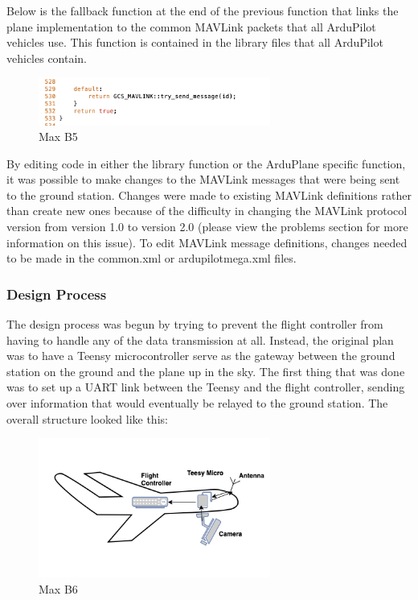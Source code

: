 \documentclass[12pt,journal,compsoc]{IEEEtran}
\begin{document}
Below is the fallback function at the end of the previous function that links the plane implementation to the common MAVLink packets that all ArduPilot vehicles use. This function is contained in the library files that all ArduPilot vehicles contain. 
\begin{figure}[h!]
\hspace*{0cm}
\centering
\includegraphics[width=3in]{Fallthrough.png}
\caption{Max B5}
\label{fallthrough}
\end{figure}

By editing code in either the library function or the ArduPlane specific function, it was possible to make changes to the MAVLink messages that were being sent to the ground station. 
Changes were made to existing MAVLink definitions rather than create new ones because of the difficulty in changing the MAVLink protocol version from version 1.0 to version 2.0 (please view the problems section for more information on this issue). To edit MAVLink message definitions, changes needed to be made in the common.xml or ardupilotmega.xml files.
\subsubsection{Design Process}
The design process was begun by trying to prevent the flight controller from having to handle any of the data transmission at all. Instead, the original plan was to have a Teensy microcontroller serve as the gateway between the ground station on the ground and the plane up in the sky. The first thing that was done was to set up a UART link between the Teensy and the flight controller, sending over information that would eventually be relayed to the ground station. The overall structure looked like this:
\begin{figure}[h!]
\hspace*{0cm}
\centering
\includegraphics[width=3in]{Version1.png}
\caption{Max B6}
\label{version1}
\end{figure}
\end{document}
